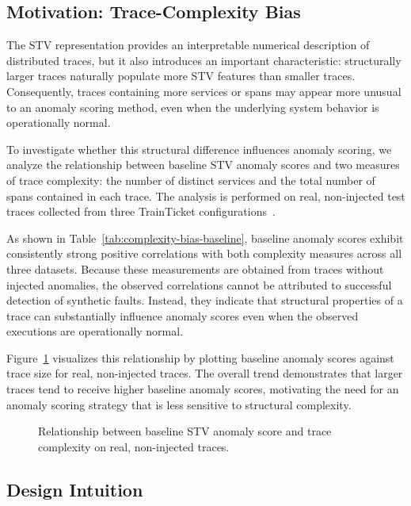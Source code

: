 \subsection{Motivation: Trace-Complexity Bias}
\label{sec:complexity-bias-background}

The STV representation provides an interpretable numerical description
of distributed traces, but it also introduces an important
characteristic: structurally larger traces naturally populate more STV
features than smaller traces. Consequently, traces containing more
services or spans may appear more unusual to an anomaly scoring method,
even when the underlying system behavior is operationally normal.

To investigate whether this structural difference influences anomaly
scoring, we analyze the relationship between baseline STV anomaly scores
and two measures of trace complexity: the number of distinct services
and the total number of spans contained in each trace. The analysis is
performed on real, non-injected test traces collected from three
TrainTicket configurations~\cite{zhou2021trainticket}.



As shown in Table~\ref{tab:complexity-bias-baseline}, baseline anomaly
scores exhibit consistently strong positive correlations with both
complexity measures across all three datasets. Because these
measurements are obtained from traces without injected anomalies, the
observed correlations cannot be attributed to successful detection of
synthetic faults. Instead, they indicate that structural properties of a
trace can substantially influence anomaly scores even when the observed
executions are operationally normal.

Figure~\ref{fig:bias} visualizes this relationship by plotting baseline
anomaly scores against trace size for real, non-injected traces. The
overall trend demonstrates that larger traces tend to receive higher
baseline anomaly scores, motivating the need for an anomaly scoring
strategy that is less sensitive to structural complexity.

\begin{figure}[t]
\centering
\caption{Relationship between baseline STV anomaly score and trace
complexity on real, non-injected traces.}
\label{fig:bias}
\end{figure}

\subsection{Design Intuition}

